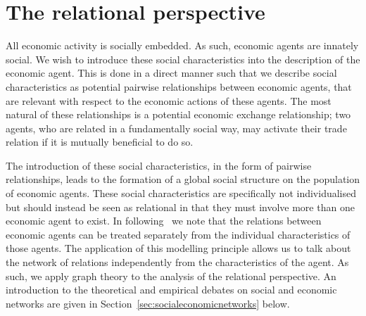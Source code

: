 

\section{The relational perspective}

All economic activity is socially embedded. As such, economic agents are innately social. We wish to introduce these social characteristics into the description of the economic agent. This is done in a direct manner such that we describe social characteristics as potential pairwise relationships between economic agents, that are relevant with respect to the economic actions of these agents. The most natural of these relationships is a potential economic exchange relationship; two agents, who are related in a fundamentally social way, may activate their trade relation if it is mutually beneficial to do so.

The introduction of these social characteristics, in the form of pairwise relationships, leads to the formation of a global social structure on the population of economic agents. These social characteristics are specifically not individualised but should instead be seen as relational in that they must involve more than one economic agent to exist. In following~\citep{Gilles1990} we note that the relations between economic agents can be treated separately from the individual characteristics of those agents. The application of this modelling principle allows us to talk about the network of relations independently from the characteristics of the agent. As such, we apply graph theory to the analysis of the relational perspective. An introduction to the theoretical and empirical debates on social and economic networks are given in Section~\ref{sec:socialeconomicnetworks} below.

